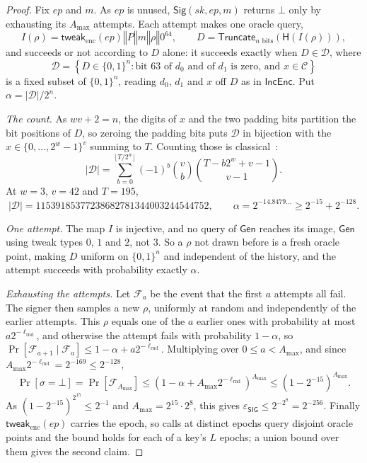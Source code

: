 \documentclass[11pt]{article}
\theoremstyle{definition}
\theoremstyle{plain}
\theoremstyle{remark}
\newcommand{\bits}[1]{\{0,1\}^{#1}}
\newcommand{\IncEnc}{\mathsf{IncEnc}}
\newcommand{\Gen}{\mathsf{Gen}}
\newcommand{\Sig}{\mathsf{Sig}}
\newcommand{\SIG}{\mathsf{SIG}}
\newcommand{\hash}{\mathsf{H}}
\newcommand{\Truncate}{\mathsf{Truncate}}
\newcommand{\concat}{\mathbin\Vert}
\newcommand{\ep}{\mathit{ep}}
\newcommand{\sk}{\mathit{sk}}
\newcommand{\lrnd}{\ell_{\mathrm{rnd}}}
\newcommand{\amax}{A_{\max}}
\begin{document}
\begin{proof}
Fix $\ep$ and $m$. As $\ep$ is unused, $\Sig(\sk,\ep,m)$ returns $\bot$ only by exhausting its $\amax$ attempts. Each attempt makes one oracle query,
\[
  I(\rho)=\mathsf{tweak}_{\mathrm{enc}}(\ep)\concat P\concat m\concat\rho\concat0^{64},
  \qquad D=\Truncate_{n\text{ bits}}\!\left(\hash(I(\rho))\right),
\]
and succeeds or not according to $D$ alone: it succeeds exactly when $D\in\mathcal D$, where
\[
  \mathcal D=\left\{D\in\bits n:\text{bit }63\text{ of }d_0\text{ and of }d_1\text{ is zero, and }x\in\mathcal C\right\}
\]
is a fixed subset of $\bits n$, reading $d_0$, $d_1$ and $x$ off $D$ as in $\IncEnc$. Put $\alpha=|\mathcal D|/2^n$.

\emph{The count.} As $wv+2=n$, the digits of $x$ and the two padding bits partition the bit positions of $D$, so zeroing the padding bits puts $\mathcal D$ in bijection with the $x\in\{0,\ldots,2^w-1\}^v$ summing to $T$. Counting those is classical~\cite{Comtet74}:
\[
  |\mathcal D|=\sum_{b=0}^{\lfloor T/2^w\rfloor}(-1)^b\binom{v}{b}\binom{T-b2^w+v-1}{v-1}.
\]
At $w=3$, $v=42$ and $T=195$,
\[
  |\mathcal D|=11539185377238682781344003244544752,\qquad \alpha=2^{-14.8479\ldots}\geq2^{-15}+2^{-128}.
\]

\emph{One attempt.} The map $I$ is injective, and no query of $\Gen$ reaches its image, $\Gen$ using tweak types $0$, $1$ and $2$, not $3$. So a $\rho$ not drawn before is a fresh oracle point, making $D$ uniform on $\bits n$ and independent of the history, and the attempt succeeds with probability exactly $\alpha$.

\emph{Exhausting the attempts.} Let $\mathcal F_a$ be the event that the first $a$ attempts all fail. The signer then samples a new $\rho$, uniformly at random and independently of the earlier attempts. This $\rho$ equals one of the $a$ earlier ones with probability at most $a2^{-\lrnd}$, and otherwise the attempt fails with probability $1-\alpha$, so $\Pr[\mathcal F_{a+1}\mid\mathcal F_a]\leq1-\alpha+a2^{-\lrnd}$. Multiplying over $0\leq a<\amax$, and since $\amax2^{-\lrnd}=2^{-169}\leq2^{-128}$,
\[
  \Pr[\sigma=\bot]=\Pr[\mathcal F_{\amax}]\leq\left(1-\alpha+\amax2^{-\lrnd}\right)^{\amax}\leq\left(1-2^{-15}\right)^{\amax}.
\]
As $\left(1-2^{-15}\right)^{2^{15}}\leq2^{-1}$ and $\amax=2^{15}\cdot2^{8}$, this gives $\varepsilon_{\SIG}\leq2^{-2^{8}}=2^{-256}$. Finally $\mathsf{tweak}_{\mathrm{enc}}(\ep)$ carries the epoch, so calls at distinct epochs query disjoint oracle points and the bound holds for each of a key's $L$ epochs; a union bound over them gives the second claim.
\end{proof}



\end{document}
